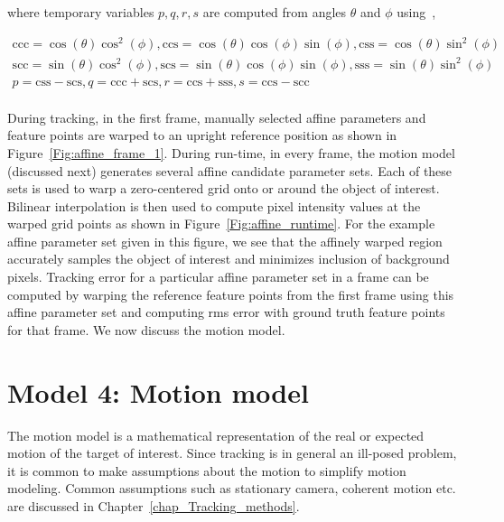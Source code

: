 \begin{Body}
\begin{enumerate}
where temporary variables $p, q, r, s$ are computed from angles $\theta$ and $\phi$ using~\cite{2008_JNL_subspaceTRK_Ross},

\begin{equation}
\begin{array}{llll}
\mathrm{ccc} = \cos(\theta) \cos^2(\phi), \mathrm{ccs} = \cos(\theta) \cos(\phi) \sin(\phi), \mathrm{css} = \cos(\theta) \sin^2(\phi)\\
\mathrm{scc} = \sin(\theta) \cos^2(\phi), \mathrm{scs} = \sin(\theta) \cos(\phi) \sin(\phi), \mathrm{sss} = \sin(\theta) \sin^2(\phi)\\
p   =  \mathrm{css} - \mathrm{scs}, q   =  \mathrm{ccc} + \mathrm{scs}, r  = \mathrm{ccs} + \mathrm{sss}, s =  \mathrm{ccs} - \mathrm{scc}\\
\end{array}
\end{equation}
\end{enumerate}

During tracking, in the first frame, manually selected affine parameters and feature points are warped to an upright reference position as shown in Figure~\ref{Fig:affine_frame_1}.  During run-time, in every frame, the motion model (discussed next) generates several affine candidate parameter sets.  Each of these sets is used to warp a zero-centered grid onto or around the object of interest.  Bilinear interpolation is then used to compute pixel intensity values at the warped grid points as shown in Figure~\ref{Fig:affine_runtime}.  For the example affine parameter set given in this figure, we see that the affinely warped region accurately samples the object of interest and minimizes inclusion of background pixels.  Tracking error for a particular affine parameter set in a frame can be computed by warping the reference feature points from the first frame using this affine parameter set and computing rms error with ground truth feature points for that frame.  We now discuss the motion model.

\section{Model 4: Motion model}
The motion model is a mathematical representation of the real or expected motion of the target of interest.  Since tracking is in general an ill-posed problem, it is common to make assumptions about the motion to simplify motion modeling.  Common assumptions such as stationary camera, coherent motion etc. are discussed in Chapter~\ref{chap_Tracking_methods}.


\end{Body}
